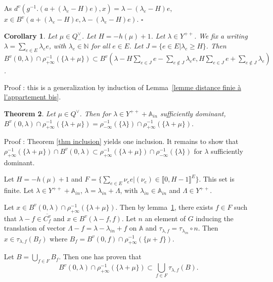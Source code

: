 \documentclass[12pt]{article}
\theoremstyle{plain}
\newtheorem{thm}{Theorem}[section] %
\newtheorem{cor}[thm]{Corollary}
\theoremstyle{definition}
\newcommand{\A}{\mathbb{A}}
\newcommand{\N}{\mathbb{N}}
\begin{document}
As $d^v(g^{-1}.(a+(\lambda_e-H)e),x)=\lambda-(\lambda_e-H)e$, $x\in B^v(a+(\lambda_e -H)e,\lambda-(\lambda_e-H)e)$. $\square$
 
 
 
\begin{cor}\label{lemme majoration du cardinal des boules}
 Let $\mu \in Q^\vee_-$. Let $H=-h(\mu)+1$. Let $\lambda\in Y^{++}$. We fix a writing  $\lambda=\sum_{e\in E}\lambda_e e$, with $\lambda_e\in \N$ for all $e\in E$. Let $J=\{e\in E | \lambda_e \geq H\}$. Then $B^v(0,\lambda)\cap \rho_{+\infty}^{-1}(\{\lambda+\mu\})\subset B^v(\lambda-H\sum_{e\in J} e-\sum_{e\notin J}\lambda_e e, H\sum_{e\in J}e+\sum_{e\notin J}\lambda_ e)$. 
\end{cor}
 
Proof : this is a generalization by induction of Lemma~\ref{lemme distance finie à l'appartement bis}.


    
 \begin{thm}\label{thm égalité des ensembles bis}
 Let $\mu\in Q^\vee$. Then for $\lambda\in Y^{++}+\A_{in}$ sufficiently dominant, $B^v(0,\lambda)\cap \rho_{+\infty}^{-1}(\{\lambda+\mu\})=\rho_{-\infty}^{-1}(\{\lambda\})\cap\rho_{+\infty}^{-1}(\{\lambda+\mu\})$.
 \end{thm}
 
 
Proof : Theorem \ref{thm inclusion} yields one inclusion. It remains to show that $\rho_{+\infty}^{-1}(\{\lambda+\mu\})\cap B^v(0,\lambda)\subset\rho_{+\infty}^{-1}(\{\lambda+\mu\})\cap \rho_{-\infty}^{-1}(\{\lambda\})$ 
for $\lambda$ sufficiently dominant.

\vspace{3mm}
Let $H=-h(\mu)+1$ and $F=\{\sum_{e\in E}\nu_e e|(\nu_e)\in \llbracket 0,H-1\rrbracket^E\}$. This set is finite. Let $\lambda\in Y^{++}+\A_{in}$, $\lambda=\lambda_{in}+\Lambda$, with $\lambda_{in}\in \A_{in}$ and $\Lambda\in Y^{++}$.

Let $x\in B^v(0,\lambda)\cap \rho_{+\infty}^{-1}(\{\lambda+\mu\})$. Then by lemma~\ref{lemme majoration du cardinal des boules}, there exists $f\in F$ such that $\lambda-f\in \overline{C^v_f}$ and $x\in B^v(\lambda-f,f)$. Let $n$ an element of $G$ inducing the translation of vector $\Lambda-f=\lambda-\lambda_{in}+f$ on $\A$ and $\tau_{\lambda,f}=\tau_{\lambda_{in}}\circ n$. Then $x\in\tau_{\lambda,f}(B_f)$ where $B_f=B^v(0,f)\cap \rho_{+\infty}^{-1}(\{\mu +f\})$.

Let $B=\bigcup_{f\in F}B_f$. Then one has proven that \[B^v(0,\lambda)\cap \rho_{+\infty}^{-1}(\{\lambda+\mu\})\subset \bigcup_{f\in F}\tau_{\lambda,f}(B).\]
\end{document}
